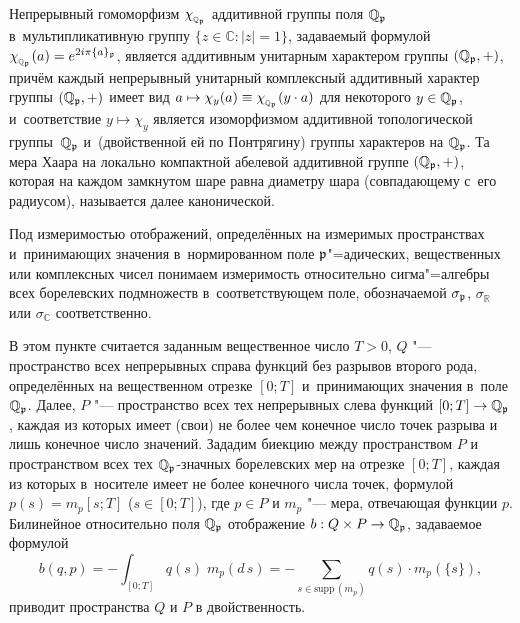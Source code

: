 Непрерывный гомоморфизм ${\chi_{{}_{\mathbb Q_{\mathfrak p}}}} $ аддитивной группы поля $\mathbb Q_{\mathfrak p}$  в~мультипли\-кативную группу $ \{z\in\mathbb C:|z|=1\} $,
задаваемый формулой $\chi_{{}_{\mathbb Q_{\mathfrak p}}}(a) = e^{2i\pi \{a\}_{\mathfrak p}}$, является аддитивным унитарным характером группы $(\mathbb Q_{\mathfrak p}, {+})$,
  причём каждый непрерывный унитарный  комплексный аддитивный характер  группы $(\mathbb Q_{\mathfrak p}, {+})$
  имеет вид $a\mapsto \chi_y(a) \equiv \chi_{{}_{\mathbb Q_{\mathfrak p}}}(y\cdot a)$ для некоторого ${y\in\mathbb Q_{\mathfrak p}}$, и~соответствие  $y\mapsto\chi_y$ является изоморфизмом  аддитивной топологической группы~$\mathbb Q_{\mathfrak p}$ и~(двойственной ей по Понтрягину) группы характеров на $\mathbb Q_{\mathfrak p}$.
  Та мера Хаара на локально компактной абелевой аддитивной группе $(\mathbb Q_{\mathfrak p}, {+})$, которая на каждом замкнутом шаре равна диаметру шара
  (совпадающему с~его радиусом),  называется далее канонической.


Под измеримостью отображений, определённых на измеримых пространствах и~принимающих значения в~нормированном поле ${\mathfrak p}$"=адических, вещественных или комплексных чисел %
понимаем измеримость относительно   сигма"=алгебры %
 всех борелевских подмножеств  в~соответствующем поле, обозначаемой $\sigma _{\mathfrak p}$, $\sigma _{\mathbb R}$ или $\sigma _{\mathbb C}$
 соответственно. %

\smallskip

В этом пункте считается заданным вещественное число $T>0$, $Q$ "---  пространство  всех непрерывных справа функций  без разрывов второго рода,
 определённых на  вещественном отрезке  $[0; T]$  и~принимающих значения в~поле $\mathbb Q_{\mathfrak p}$.
 Далее, $P$ "--- пространство всех тех непрерывных слева функций  $[0; T]\to\mathbb Q_{\mathfrak p}$, каждая из которых  имеет %
 (свои) не более чем конечное число  точек разрыва и лишь конечное число значений.
 Зададим биекцию  между пространством $P$ и~ пространством всех тех $\mathbb Q_{\mathfrak p}$-значных борелевских мер на отрезке $[0; T]$,
 каждая из которых в~носителе имеет не более конечного числа точек,  формулой
 $p(s)=m_p[s; T]$  ($s\in[0; T]$), где $p\in P$ и $m_p$ "--- мера, отвечающая функции $p$.
Билинейное относительно поля $\mathbb Q_{\mathfrak p} $
 отображение  
 $
 b :
 Q \times P  \to\mathbb Q_{\mathfrak p}
 $,
 задаваемое формулой 
 $$ 
 b (q,p) =-\int_{[0;T]} q(s)\;m_p(d\,s)
 =-\sum_{s\in\mathrm{supp\,} (m_p)}q(s)\cdot m_p(\{s\}),
$$
   приводит пространства
 $
 Q
 $
  и
 $
 P
 $
 в двойственность.



